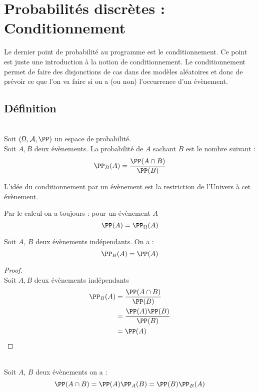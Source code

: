 \documentclass[12pt,fleqn]{report} %
\begin{document}
\setcounter{chapter}{9}
\chapter{Probabilités discrètes : Conditionnement}

Le dernier point de probabilité au programme est le conditionnement. Ce point est juste une introduction à la notion de conditionnement. Le conditionnement permet de faire des disjonctions de cas dans des modèles aléatoires et donc de prévoir ce que l'on va faire si on a (ou non) l'occurrence d'un évènement.

\section{Définition}
\begin{definition}\label{Def Proba Cond}\text{ }\\
	Soit $(\Omega,\mathcal{A},\PP)$ un espace de probabilité.\\ Soit $A,B$ deux évènements. 
	La probabilité de $A$ sachant $B$ est le nombre suivant : 
	\[
	\PP_B(A) = \frac{\PP(A \cap B)}{\PP(B)}
	\]
\end{definition}

\begin{remark}
	L'idée du conditionnement par un évènement est la restriction de l'Univers à cet évènement.
	
	Par le calcul on a toujours : pour un évènement $A$
	\[
	\PP(A) = \PP_\Omega(A)
	\]
\end{remark}

\begin{remark}
	Soit $A$, $B$ deux évènements indépendants. On a :
	\[
	\PP_B(A) = \PP(A)
	\]
\end{remark}
\begin{proof}\text{ }\\
	Soit $A,B$ deux évènements indépendants
	\begin{align*}
	\PP_B(A) &= \frac{\PP(A \cap B)}{\PP(B)} \\
	& = \frac{\PP(A)\PP(B)}{\PP(B)}\\
	& = \PP(A)
	\end{align*}
\end{proof}
\begin{proposition}\text{ }\\
	Soit $A$, $B$ deux évènements on a : 
	\[
	\PP(A \cap B) = \PP(A)\PP_A(B)= \PP(B)\PP_B(A)
	\]
\end{proposition}
\end{document}
